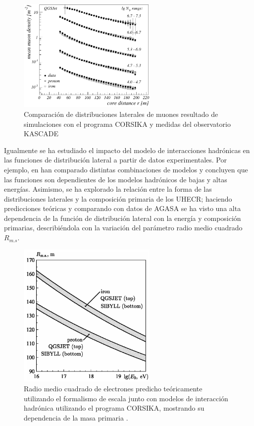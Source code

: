 \begin{figure}[]
\centering
\includegraphics[width=0.6\textwidth]{Figuras/Apel2005} 
\caption{Comparación de distribuciones laterales de muones resultado de simulaciones con el programa CORSIKA y medidas del observatorio KASCADE \cite{Apel2005}}
\label{fig:Apel}
\end{figure}

Igualmente se ha estudiado el impacto del modelo de interacciones hadrónicas en las funciones de distribución lateral a partir de datos experimentales. Por ejemplo, en \cite{Drescher2003} han comparado distintas combinaciones de modelos y concluyen que las funciones son dependientes de los modelos hadrónicos de bajas y altas energías. Asimismo, se ha explorado la relación entre la forma de las distribuciones laterales y la composición primaria de los UHECR; haciendo predicciones teóricas \cite{Raikin2001} y comparando con datos de AGASA se ha visto una alta dependencia de la función de distribución lateral con la energía y composición primarias, describiéndola con la variación del parámetro radio medio cuadrado $R_{m.s}$.

\begin{figure}[]
\centering
\includegraphics[width=0.6\textwidth, height=0.5\textwidth]{Figuras/Raikin2001} 
\caption{Radio medio cuadrado de electrones predicho teóricamente utilizando el formalismo de escala junto con modelos de interacción hadrónica utilizando el programa CORSIKA, mostrando su dependencia de la masa primaria \cite{Raikin2001}.}
\label{fig:Raikin}
\end{figure}

\singlespace


